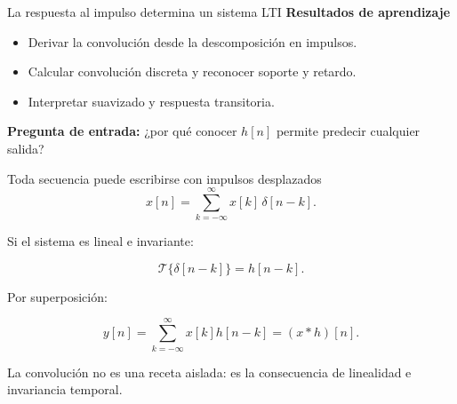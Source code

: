\documentclass[
  ignorenonframetext,
  aspectratio=169,
  spanish,
  professionalfonts]{beamer}
\providecommand{\tightlist}{%
  \setlength{\itemsep}{0pt}\setlength{\parskip}{0pt}}
\begin{document}
\begin{frame}{La respuesta al impulso determina un sistema LTI}
\protect{}\label{la-respuesta-al-impulso-determina-un-sistema-lti}
\textbf{Resultados de aprendizaje}

\begin{itemize}
\tightlist
\item
  Derivar la convolución desde la descomposición en impulsos.
\item
  Calcular convolución discreta y reconocer soporte y retardo.
\item
  Interpretar suavizado y respuesta transitoria.
\end{itemize}

\textbf{Pregunta de entrada:} ¿por qué conocer \(h[n]\) permite predecir
cualquier salida?
\end{frame}

\begin{frame}[shrink]{Toda secuencia puede escribirse con impulsos
desplazados}
\protect{}\label{toda-secuencia-puede-escribirse-con-impulsos-desplazados}
\[
x[n]=\sum_{k=-\infty}^{\infty}x[k]\,\delta[n-k].
\]

Si el sistema es lineal e invariante:

\[
\mathcal{T}\{\delta[n-k]\}=h[n-k].
\]

Por superposición:

\[
y[n]=\sum_{k=-\infty}^{\infty}x[k]h[n-k]=(x*h)[n].
\]

\begin{tcolorbox}[enhanced jigsaw, arc=.35mm, bottomrule=.15mm, bottomtitle=1mm, breakable, colback=white, colbacktitle=quarto-callout-important-color!10!white, colframe=quarto-callout-important-color-frame, coltitle=black, left=2mm, leftrule=.75mm, opacityback=0, opacitybacktitle=0.6, rightrule=.15mm, title={Concepto principal}, titlerule=0mm, toprule=.15mm, toptitle=1mm]

La convolución no es una receta aislada: es la consecuencia de
linealidad e invariancia temporal.

\end{tcolorbox}
\end{frame}
\end{document}
